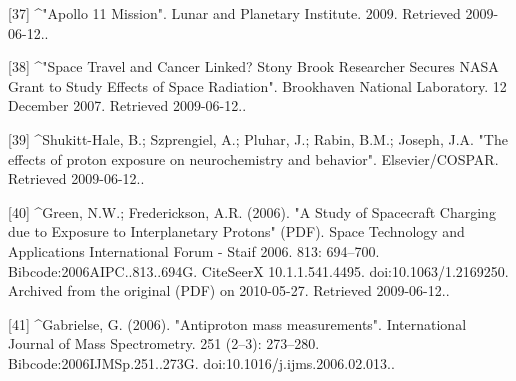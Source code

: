 [37]
^"Apollo 11 Mission". Lunar and Planetary Institute. 2009. Retrieved 2009-06-12..

[38]
^"Space Travel and Cancer Linked? Stony Brook Researcher Secures NASA Grant to Study Effects of Space Radiation". Brookhaven National Laboratory. 12 December 2007. Retrieved 2009-06-12..

[39]
^Shukitt-Hale, B.; Szprengiel, A.; Pluhar, J.; Rabin, B.M.; Joseph, J.A. "The effects of proton exposure on neurochemistry and behavior". Elsevier/COSPAR. Retrieved 2009-06-12..

[40]
^Green, N.W.; Frederickson, A.R. (2006). "A Study of Spacecraft Charging due to Exposure to Interplanetary Protons" (PDF). Space Technology and Applications International Forum - Staif 2006. 813: 694–700. Bibcode:2006AIPC..813..694G. CiteSeerX 10.1.1.541.4495. doi:10.1063/1.2169250. Archived from the original (PDF) on 2010-05-27. Retrieved 2009-06-12..

[41]
^Gabrielse, G. (2006). "Antiproton mass measurements". International Journal of Mass Spectrometry. 251 (2–3): 273–280. Bibcode:2006IJMSp.251..273G. doi:10.1016/j.ijms.2006.02.013..